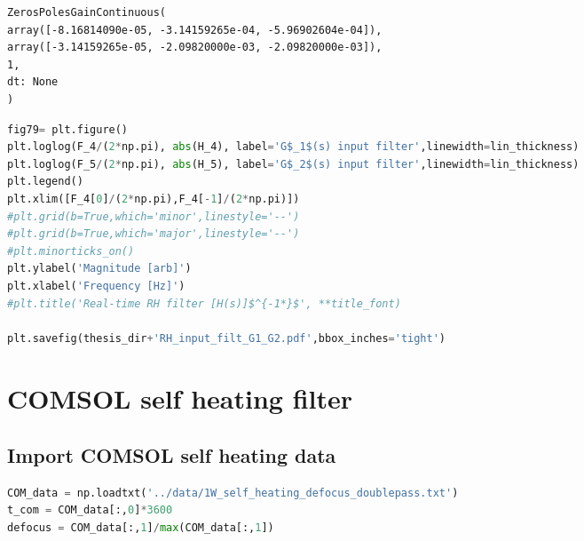 \begin{spacing}{1} \begin{lstlisting}
ZerosPolesGainContinuous(
array([-8.16814090e-05, -3.14159265e-04, -5.96902604e-04]),
array([-3.14159265e-05, -2.09820000e-03, -2.09820000e-03]),
1,
dt: None
)
\end{lstlisting} \end{spacing}

\begin{spacing}{1} \begin{lstlisting}[language=Python]
fig79= plt.figure()
plt.loglog(F_4/(2*np.pi), abs(H_4), label='G$_1$(s) input filter',linewidth=lin_thickness)
plt.loglog(F_5/(2*np.pi), abs(H_5), label='G$_2$(s) input filter',linewidth=lin_thickness)
plt.legend()
plt.xlim([F_4[0]/(2*np.pi),F_4[-1]/(2*np.pi)])
#plt.grid(b=True,which='minor',linestyle='--')
#plt.grid(b=True,which='major',linestyle='--')
#plt.minorticks_on()
plt.ylabel('Magnitude [arb]')
plt.xlabel('Frequency [Hz]')
#plt.title('Real-time RH filter [H(s)]$^{-1*}$', **title_font)

plt.savefig(thesis_dir+'RH_input_filt_G1_G2.pdf',bbox_inches='tight')
\end{lstlisting} \end{spacing}


\hypertarget{comsol-self-heating-filter}{%
\section{COMSOL self heating filter}\label{comsol-self-heating-filter}}

\hypertarget{import-comsol-self-heating-data}{%
\subsection{Import COMSOL self heating
data}\label{import-comsol-self-heating-data}}

\begin{spacing}{1} \begin{lstlisting}[language=Python]
COM_data = np.loadtxt('../data/1W_self_heating_defocus_doublepass.txt')
t_com = COM_data[:,0]*3600
defocus = COM_data[:,1]/max(COM_data[:,1])
\end{lstlisting} \end{spacing}

